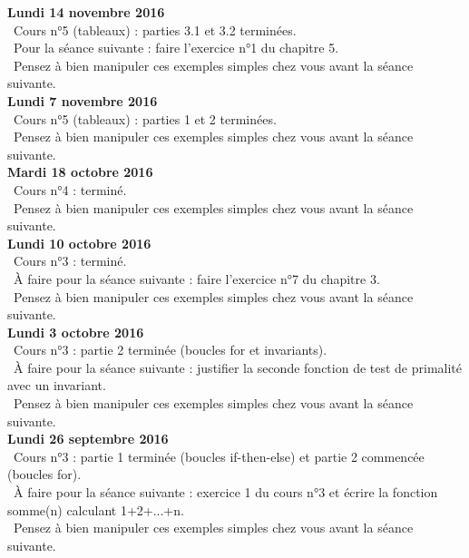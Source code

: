 \documentclass[12pt,a4paper]{article}
\begin{document}
\noindent\textbf{Lundi 14 novembre 2016 }\\
\bu\ Cours n°5 (tableaux) : parties 3.1 et 3.2 terminées. \\
\bu\ Pour la séance suivante : faire l'exercice n°1 du chapitre 5. \\
\bu\ Pensez à bien manipuler ces exemples simples chez vous avant la séance suivante. \vspace{.4cm}\\

\noindent\textbf{Lundi 7 novembre 2016 }\\
\bu\ Cours n°5 (tableaux) : parties 1 et 2 terminées. \\
\bu\ Pensez à bien manipuler ces exemples simples chez vous avant la séance suivante. \vspace{.4cm}\\

\noindent\textbf{Mardi 18 octobre 2016 }\\
\bu\ Cours n°4 : terminé. \\
\bu\ Pensez à bien manipuler ces exemples simples chez vous avant la séance suivante. \vspace{.4cm}\\

\noindent\textbf{Lundi 10 octobre 2016 }\\
\bu\ Cours n°3 : terminé. \\
\bu\ À faire pour la séance suivante : faire l'exercice n°7 du chapitre 3. \\
\bu\ Pensez à bien manipuler ces exemples simples chez vous avant la séance suivante. \vspace{.4cm}\\

\noindent\textbf{Lundi 3 octobre 2016 }\\
\bu\ Cours n°3 : partie 2 terminée (boucles for et invariants). \\
\bu\ À faire pour la séance suivante : justifier la seconde fonction de test de primalité avec un invariant. \\
\bu\ Pensez à bien manipuler ces exemples simples chez vous avant la séance suivante. \vspace{.4cm}\\

\noindent\textbf{Lundi 26 septembre 2016 }\\
\bu\ Cours n°3 : partie 1 terminée (boucles if-then-else) et partie 2 commencée (boucles for). \\
\bu\ À faire pour la séance suivante : exercice 1 du cours n°3 et écrire la fonction somme(n) calculant 1+2+...+n. \\
\bu\ Pensez à bien manipuler ces exemples simples chez vous avant la séance suivante. \vspace{.4cm}\\
\end{document}
